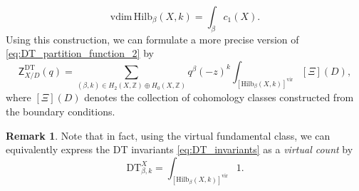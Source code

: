 \documentclass[11pt,colorinlistoftodos]{amsart}
\numberwithin{equation}{subsection}
\theoremstyle{plain}
\theoremstyle{definition}
\newtheorem{rem}[thm]{Remark}
\theoremstyle{remark}
\newcommand{\Z}{\mathbb{Z}}
\begin{document}
\[
\mathrm{vdim}\,\mathrm{Hilb}_{\beta}(X,k)=\int_\beta c_1(X).
\]
Using this construction, we can formulate a more precise version of \eqref{eq:DT_partition_function_2} by 
\begin{equation}
\label{eq:DT_partition_function_3}
\mathsf{Z}^\mathrm{DT}_{X/D}(q)=\sum_{(\beta,k)\in H_2(X,\mathbb{Z})\oplus H_0(X,\Z)}q^\beta(-z)^k\int_{[\mathrm{Hilb}_{\beta}(X,k)]^\mathrm{vir}}[\Xi](D),
\end{equation}
where $[\Xi](D)$ denotes the collection of cohomology classes constructed from the boundary conditions. 

\begin{rem}
Note that in fact, using the virtual fundamental class, we can equivalently express the DT invariants \eqref{eq:DT_invariants} as a \emph{virtual count} by 
\[
\mathrm{DT}^X_{\beta,k}=\int_{\left[\mathrm{Hilb}_\beta(X,k)\right]^\mathrm{vir}}1.
\]
\end{rem}
\end{document}
